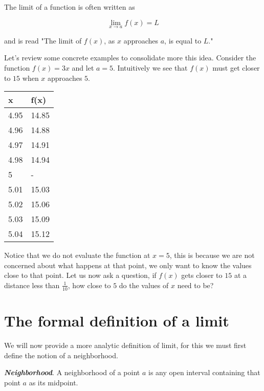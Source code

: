 \documentclass{report}
\begin{document}
The limit of a function is often written as

$$\lim_{x \to a} f(x) = L$$

and is read "The limit of $f(x)$, as $x$ approaches $a$, is equal to $L$."

Let's review some concrete examples to consolidate more this idea. Consider the function $f(x) = 3x$ and let $a = 5$. Intuitively we see that $f(x)$ must get closer to $15$ when $x$ approaches $5$.

\begin{table}[h]
    \begin{center}
        \begin{tabular}{|l|l|}
        \hline
        x    & f(x)  \\ \hline
        4.95 & 14.85 \\
        4.96 & 14.88 \\
        4.97 & 14.91 \\
        4.98 & 14.94 \\
        5    & -     \\
        5.01 & 15.03 \\
        5.02 & 15.06 \\
        5.03 & 15.09 \\
        5.04 & 15.12 \\ \hline
        \end{tabular}
    \end{center}
\end{table}

Notice that we do not evaluate the function at $x=5$, this is because we are not concerned about what happens at that point, we only want to know the values close to that point. Let us now ask a question, if $f(x)$ gets closer to $15$ at a distance less than $\frac{1}{10}$, how close to $5$ do the values of $x$ need to be?

\section{The formal definition of a limit}

We will now provide a more analytic definition of limit, for this we must first define the notion of a neighborhood.

\begin{defBox}
    \textit{\textbf{Neighborhood}}. A neighborhood of a point $a$ is any open interval containing that point $a$ as its midpoint.
\end{defBox}
\end{document}

